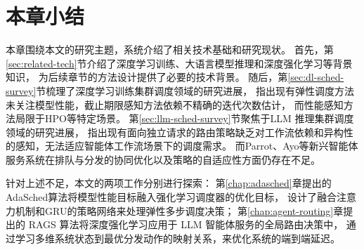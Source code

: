 \section{本章小结}\label{sec:chap2-summary}

本章围绕本文的研究主题，系统介绍了相关技术基础和研究现状。
首先，第\ref{sec:related-tech}节介绍了深度学习训练、大语言模型推理和深度强化学习等背景知识，
为后续章节的方法设计提供了必要的技术背景。
随后，第\ref{sec:dl-sched-survey}节梳理了深度学习训练集群调度领域的研究进展，
指出现有弹性调度方法未关注模型性能，截止期限感知方法依赖不精确的迭代次数估计，
而性能感知方法局限于HPO等特定场景。
第\ref{sec:llm-sched-survey}节聚焦于LLM 推理集群调度领域的研究进展，
指出现有面向独立请求的路由策略缺乏对工作流依赖和异构性的感知，无法适应智能体工作流场景下的调度需求。
而Parrot、Ayo等新兴智能体服务系统在排队与分发的协同优化以及策略的自适应性方面仍存在不足。

针对上述不足，本文的两项工作分别进行探索：
第\ref{chap:adasched}章提出的AdaSched算法将模型性能目标融入强化学习调度器的优化目标，
设计了融合注意力机制和GRU的策略网络来处理弹性多步调度决策；
第\ref{chap:agent-routing}章提出的 RAGS 算法将深度强化学习应用于 LLM 智能体服务的全局路由决策中，
通过学习多维系统状态到最优分发动作的映射关系，来优化系统的端到端延迟。

\cleardoublepage
